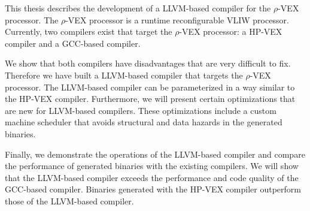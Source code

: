 This thesis describes the development of a LLVM-based compiler for the $\rho$-VEX processor. The $\rho$-VEX processor is a runtime reconfigurable VLIW processor. Currently, two compilers exist that target the $\rho$-VEX processor: a HP-VEX compiler and a GCC-based compiler.

We show that both compilers have disadvantages that are very difficult to fix. Therefore we have built a LLVM-based compiler that targets the $\rho$-VEX processor. The LLVM-based compiler can be parameterized in a way similar to the HP-VEX compiler. Furthermore, we will present certain optimizations that are new for LLVM-based compilers. These optimizations include a custom machine scheduler that avoids structural and data hazards in the generated binaries.

Finally, we demonstrate the operations of the LLVM-based compiler and compare the performance of generated binaries with the existing compilers. We will show that the LLVM-based compiler exceeds the performance and code quality of the GCC-based compiler. Binaries generated with the HP-VEX compiler outperform those of the LLVM-based compiler.

